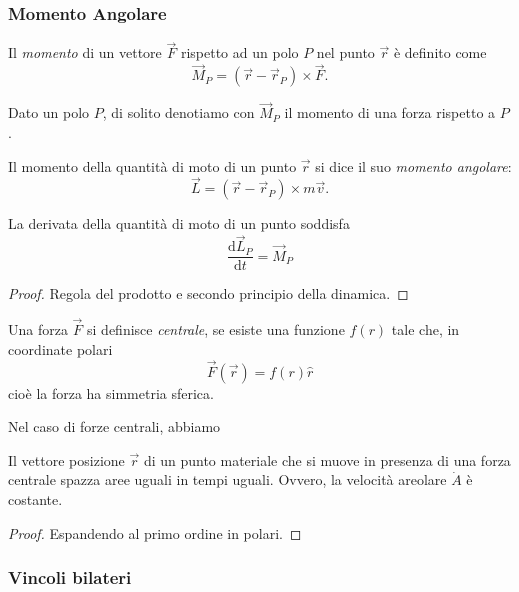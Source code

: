 \documentclass[11pt]{scrartcl}
\newcommand{\dif}{\text{d}}
\newcommand{\posit}{\vec{r}}
\begin{document}
	\subsubsection{Momento Angolare}
	
	\begin{definition}[Momento]
		Il \textit{momento} di un vettore $\vec{F}$ rispetto ad un polo $P$ nel punto $\posit$ è definito come
		$$\vec{M}_P=(\posit-\posit_P)\times \vec{F}.$$
	\end{definition}
	Dato un polo $P$, di solito denotiamo con $\vec{M}_P$ il momento di una forza rispetto a $P$. 
	\begin{definition}
		Il momento della quantità di moto di un punto $\posit$ si dice il suo \textit{momento angolare}:
		$$\vec{L}=(\posit-\posit_P)\times m\vec{v}.$$
	\end{definition}
	\begin{theorem}
		La derivata della quantità di moto di un punto soddisfa
		$$\frac{\dif \vec{L}_P}{\dif t}=\vec{M}_P$$
	\end{theorem}
	\begin{proof}
		Regola del prodotto e secondo principio della dinamica.
	\end{proof}
	\begin{definition}
		Una forza $\vec{F}$ si definisce \textit{centrale}, se esiste una funzione $f(r)$ tale che, in coordinate polari
		$$\vec{F}(\posit)=f(r)\hat{r}$$
		cioè la forza ha simmetria sferica.
	\end{definition}
	Nel caso di forze centrali, abbiamo
	\begin{theorem}
		Il vettore posizione $\posit$ di un punto materiale che si muove in presenza di una forza centrale spazza aree uguali in tempi uguali. Ovvero, la velocità areolare $\dot{A}$ è costante.
	\end{theorem}
	\begin{proof}
		Espandendo al primo ordine in polari.
	\end{proof}
	
	\subsubsection{Vincoli bilateri}
	
\end{document}

